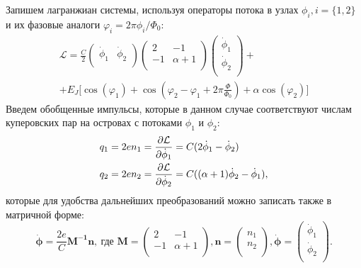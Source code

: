 Запишем лагранжиан системы, используя операторы потока в узлах $\phi_i, i=\{1,2\}$ и их фазовые аналоги $\varphi_i=2\pi\phi_i/\Phi_0$:
\begin{multline}\label{eq: Lagr_flux}
{\mathcal{L}} = \frac{C}{2}
\begin{pmatrix}\dot{\phi}_1 &\dot{\phi}_2\\
	\end{pmatrix}
\begin{pmatrix}
	2 & -1\\ 
	-1 & \alpha+1 \\
\end{pmatrix}
\begin{pmatrix}\dot{\phi}_1\\\dot{\phi}_2\\\end{pmatrix}
 + \\ + E_J\Big[ \cos(\varphi_1)+\cos(\varphi_2-\varphi_1+2\pi\frac{\Phi}{\Phi_0})+\alpha\cos(\varphi_2)\Big] 
\end{multline}
Введем обобщенные импульсы, которые в данном случае соответствуют числам куперовских пар на островах с потоками $\phi_1$ и $\phi_2$: 
\begin{equation}
\centering
\begin{aligned}
q_1 = 2en_1 & = \frac{\partial\mathcal{L}}{\partial\dot{\phi}_1} = {C}(2\dot{\phi}_1-\dot{\phi}_2) \\
q_2 = 2en_2 & = \frac{\partial\mathcal{L}}{\partial\dot{\phi}_2} = {C}((\alpha+1)\dot{\phi}_2-\dot{\phi}_1),
\end{aligned}
\end{equation}
которые для удобства дальнейших преобразований можно записать также в матричной форме: 
\begin{equation}
\mathbf{\dot{\boldsymbol{\phi}}} = \frac{2e}{C}\mathbf{M^{-1}}\mathbf{n},\ \text{где } \mathbf{M}=\begin{pmatrix}
2 & -1\\ 
-1 & \alpha+1 \\
\end{pmatrix}, \mathbf{n} = \begin{pmatrix}n_1\\n_2\\\end{pmatrix}, 
\mathbf{\dot{\boldsymbol{\phi}}} = \begin{pmatrix}\dot{\phi}_1\\\dot{\phi}_2\\\end{pmatrix}.
\end{equation}
